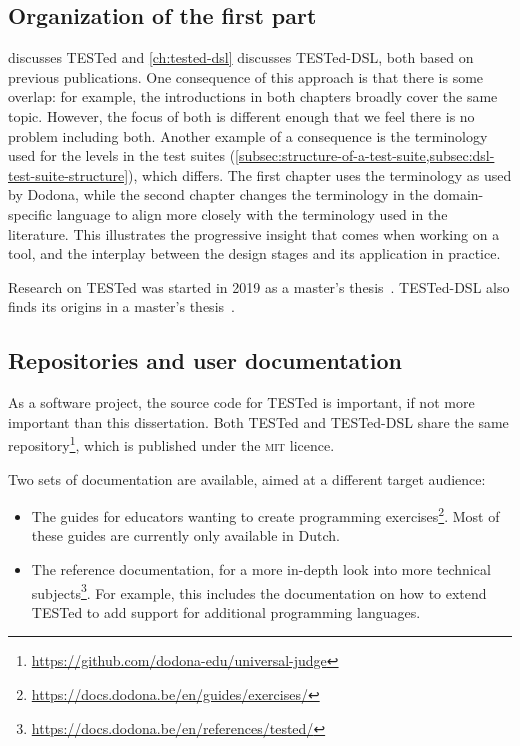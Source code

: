 \documentclass[../main]{subfiles}
\begin{document}
\subsection{Organization of the first part}\label{subsec:organization-of-the-first-part}

 discusses TESTed and \cref{ch:tested-dsl} discusses TESTed-DSL, both based on previous publications.
One consequence of this approach is that there is some overlap: for example, the introductions in both chapters broadly cover the same topic.
However, the focus of both is different enough that we feel there is no problem including both.
Another example of a consequence is the terminology used for the levels in the test suites (\cref{subsec:structure-of-a-test-suite,subsec:dsl-test-suite-structure}), which differs.
The first chapter uses the terminology as used by Dodona, while the second chapter changes the terminology in the domain-specific language to align more closely with the terminology used in the literature.
This illustrates the progressive insight that comes when working on a tool, and the interplay between the design stages and its application in practice.

Research on TESTed was started in 2019 as a master's thesis~\autocite{strijbolTESTedOneJudge2020}.
TESTed-DSL also finds its origins in a master's thesis~\autocite{selsTESTedProgrammeertaalonafhankelijkTesten2021}.

\subsection{Repositories and user documentation}\label{subsec:repositories-and-code}

As a software project, the source code for TESTed is important, if not more important than this dissertation.
Both TESTed and TESTed-DSL share the same repository\footnote{\url{https://github.com/dodona-edu/universal-judge}}, which is published under the \textsc{mit} licence.

Two sets of documentation are available, aimed at a different target audience:

\begin{itemize}
    \item The guides for educators wanting to create programming exercises\footnote{\url{https://docs.dodona.be/en/guides/exercises/}}.
    Most of these guides are currently only available in Dutch.
    \item The reference documentation, for a more in-depth look into more technical subjects\footnote{\url{https://docs.dodona.be/en/references/tested/}}.
    For example, this includes the documentation on how to extend TESTed to add support for additional programming languages.
\end{itemize}
\end{document}
